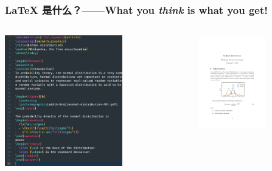 \begin{frame}[fragile]
\frametitle{\LaTeX{} 是什么？\mbox{}——\mbox{}What you \emph{think} is what you get!}
\begin{columns}
\begin{column}{0.48\textwidth}
  \centering
  \includegraphics[width=0.75\textwidth]{examples/normal-dist/code.png}
\end{column}
\begin{column}{0.48\textwidth}
  \begin{figure}
    \centering
    \includegraphics[width=0.75\textwidth]{examples/normal-dist/normal-dist.pdf}
  \end{figure}
\end{column}
\end{columns}
\end{frame}

